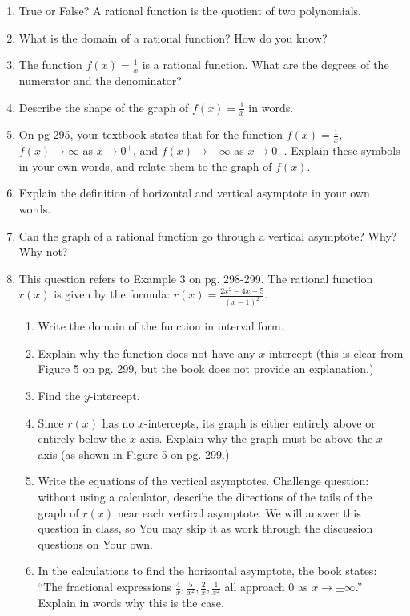\documentclass[12pt,dvipsnames]{article}
\begin{document}
\begin{enumerate}[label=\arabic*., leftmargin=2\parindent,
labelindent=\parindent, labelsep=*]	

	\item True or False? A rational function is the quotient of two polynomials. 
	\item What is the domain of a rational function? How do you know?
	\item The function $\displaystyle f(x)=\frac{1}{x}$ is a rational function. What are the degrees of the numerator and the denominator?
	\item Describe the shape of the graph of $\displaystyle f(x)=\frac{1}{x}$ in words.
	
	\item On pg 295, your textbook states that for the function $\displaystyle f(x)=\frac{1}{x}$, $f(x)\to \infty$ as $x\to 0^{+}$, and $f(x)\to -\infty$ as $x\to 0^{-}$. Explain these symbols in your own words, and relate them to the graph of $f(x)$.
	\item Explain the definition of horizontal and vertical asymptote in your own words.
	\item Can the graph of a rational function go through a vertical asymptote? Why? Why not?

\item This question refers to Example 3 on pg. 298-299. The rational function $r(x)$ is given by the formula: $\displaystyle r(x)=\frac{2x^2-4x+5}{(x-1)^2}.$
\begin{enumerate}
	\item Write the domain of the function in interval form.
	\item Explain why the function does not have any $x$-intercept (this is clear from Figure 5 on pg. 299, but the book does not provide an explanation.)
	\item Find the $y$-intercept.
	\item Since $r(x)$ has no $x$-intercepts, its graph is either entirely above or entirely below the $x$-axis. Explain why the graph must be above the $x$-axis (as shown in Figure 5 on pg. 299.)
\item Write the equations of the vertical asymptotes. Challenge question: without using a calculator, describe the directions of the tails of the graph of $r(x)$ near each vertical asymptote. We will answer this question in class, so You may skip it as work through the discussion questions on Your own.
	\item In the calculations to find the horizontal asymptote, the book states: \enquote{The fractional expressions $\displaystyle \frac{4}{x},\frac{5}{x^2}, \frac{2}{x}, \frac{1}{x^2}$ all approach 0 as $x\to\pm\infty$.} Explain in words why this is the case.
	

\end{enumerate}
\end{enumerate}
\end{document}
